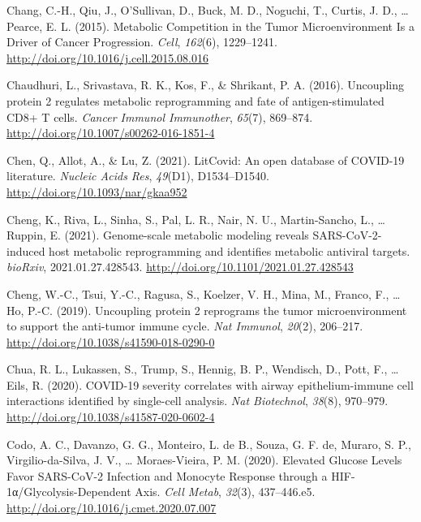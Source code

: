 \documentclass[12pt,twoside,openany,\mydriver]{thesis}  %
\begin{document}
\leavevmode\hypertarget{ref-chang_metabolic_2015}{}%
Chang, C.-H., Qiu, J., O'Sullivan, D., Buck, M. D., Noguchi, T., Curtis, J. D., \ldots{} Pearce, E. L. (2015). Metabolic Competition in the Tumor Microenvironment Is a Driver of Cancer Progression. \emph{Cell}, \emph{162}(6), 1229--1241. \url{http://doi.org/10.1016/j.cell.2015.08.016}

\leavevmode\hypertarget{ref-chaudhuri_uncoupling_2016}{}%
Chaudhuri, L., Srivastava, R. K., Kos, F., \& Shrikant, P. A. (2016). Uncoupling protein 2 regulates metabolic reprogramming and fate of antigen-stimulated CD8+ T cells. \emph{Cancer Immunol Immunother}, \emph{65}(7), 869--874. \url{http://doi.org/10.1007/s00262-016-1851-4}

\leavevmode\hypertarget{ref-chen_litcovid_2021}{}%
Chen, Q., Allot, A., \& Lu, Z. (2021). LitCovid: An open database of COVID-19 literature. \emph{Nucleic Acids Res}, \emph{49}(D1), D1534--D1540. \url{http://doi.org/10.1093/nar/gkaa952}

\leavevmode\hypertarget{ref-cheng_genome-scale_2021}{}%
Cheng, K., Riva, L., Sinha, S., Pal, L. R., Nair, N. U., Martin-Sancho, L., \ldots{} Ruppin, E. (2021). Genome-scale metabolic modeling reveals SARS-CoV-2-induced host metabolic reprogramming and identifies metabolic antiviral targets. \emph{bioRxiv}, 2021.01.27.428543. \url{http://doi.org/10.1101/2021.01.27.428543}

\leavevmode\hypertarget{ref-cheng_uncoupling_2019}{}%
Cheng, W.-C., Tsui, Y.-C., Ragusa, S., Koelzer, V. H., Mina, M., Franco, F., \ldots{} Ho, P.-C. (2019). Uncoupling protein 2 reprograms the tumor microenvironment to support the anti-tumor immune cycle. \emph{Nat Immunol}, \emph{20}(2), 206--217. \url{http://doi.org/10.1038/s41590-018-0290-0}

\leavevmode\hypertarget{ref-chua_covid-19_2020}{}%
Chua, R. L., Lukassen, S., Trump, S., Hennig, B. P., Wendisch, D., Pott, F., \ldots{} Eils, R. (2020). COVID-19 severity correlates with airway epithelium-immune cell interactions identified by single-cell analysis. \emph{Nat Biotechnol}, \emph{38}(8), 970--979. \url{http://doi.org/10.1038/s41587-020-0602-4}

\leavevmode\hypertarget{ref-codo_elevated_2020}{}%
Codo, A. C., Davanzo, G. G., Monteiro, L. de B., Souza, G. F. de, Muraro, S. P., Virgilio-da-Silva, J. V., \ldots{} Moraes-Vieira, P. M. (2020). Elevated Glucose Levels Favor SARS-CoV-2 Infection and Monocyte Response through a HIF-1α/Glycolysis-Dependent Axis. \emph{Cell Metab}, \emph{32}(3), 437--446.e5. \url{http://doi.org/10.1016/j.cmet.2020.07.007}
\end{document}
